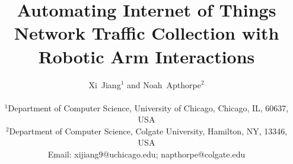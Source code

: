 \documentclass[journal]{IEEEtran}
\begin{document}
\title{Automating Internet of Things Network Traffic Collection with Robotic Arm Interactions}
%
%

\author{Xi~Jiang$^1$
        and Noah~Apthorpe$^2$\\
         \begin{small} $^1$Department of Computer Science, University of Chicago, Chicago, IL, 60637, USA\\%
    $^2$Department of Computer Science, Colgate University, Hamilton, NY, 13346, USA\\%
    Email: xijiang9@uchicago.edu; napthorpe@colgate.edu
    \end{small}
}%


%
%
\end{document}
